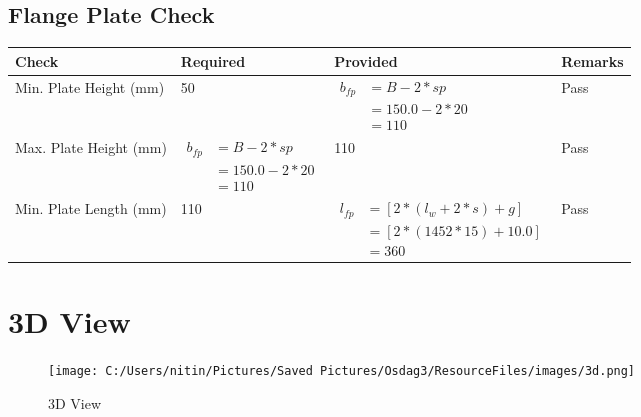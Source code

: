 \documentclass{article}%
\begin{document}
%
\newpage%
\subsection{Flange Plate Check}%
\label{subsec:FlangePlateCheck}%
\renewcommand{\arraystretch}{1.2}%
\begin{longtable}{|p{4cm}|p{6cm}|p{5.5cm}|p{1.5cm}|}%
\hline%
\rowcolor{OsdagGreen}%
Check&Required&Provided&Remarks\\%
\hline%
\endhead%
\hline%
Min. Plate Height (mm)&50&$\begin{aligned} b_{fp} &= {B - 2*sp} \\ &= {150.0 - 2 * 20} \\ &=110\end{aligned}$&Pass\\%
\hline%
Max. Plate Height (mm)&$\begin{aligned} b_{fp} &= {B - 2*sp} \\ &= {150.0 - 2 * 20} \\ &=110\end{aligned}$&110&Pass\\%
\hline%
Min. Plate Length (mm)&110&$\begin{aligned} l_{fp} & = [2*(l_{w} + 2*s) + g]\\ &= [2*(1452*15) +10.0]\\ &=360\end{aligned}$&Pass\\%
\hline%
\end{longtable}

%
%
\newpage%
\section{3D View}%
\label{sec:3DView}%


\begin{figure}[h!]%
\centering%
\texttt{[image: C:/Users/nitin/Pictures/Saved Pictures/Osdag3/ResourceFiles/images/3d.png]}%
\caption{3D View}%
\end{figure}

%
\end{document}
